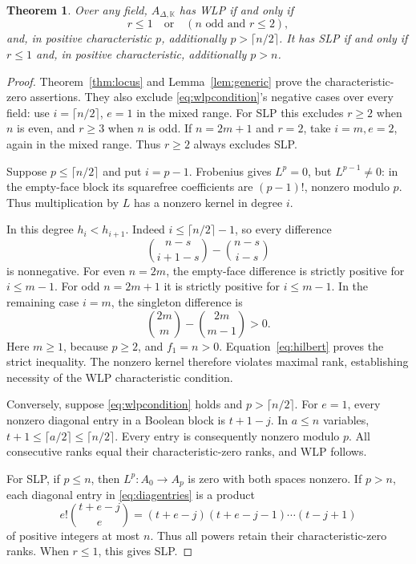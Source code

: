 \documentclass[11pt]{article}
\newtheorem{theorem}{Theorem}[section]
\theoremstyle{remark}
\newcommand{\kk}{\mathbb K}
\begin{document}
\begin{theorem}\label{thm:classification}
Over any field, $A_{\Delta,\kk}$ has WLP if and only if
\begin{equation}\label{eq:wlpcondition}
 r\leq1\quad\text{or}\quad(n\text{ odd and }r\leq2),
\end{equation}
and, in positive characteristic $p$, additionally $p>\lceil n/2\rceil$.
It has SLP if and only if $r\leq1$ and, in positive characteristic, additionally $p>n$.
\end{theorem}
\begin{proof}
Theorem~\ref{thm:locus} and Lemma~\ref{lem:generic} prove the characteristic-zero assertions. They also exclude \eqref{eq:wlpcondition}'s negative cases over every field: use $i=\lceil n/2\rceil$, $e=1$ in the mixed range. For SLP this excludes $r\geq2$ when $n$ is even, and $r\geq3$ when $n$ is odd. If $n=2m+1$ and $r=2$, take $i=m,e=2$, again in the mixed range. Thus $r\geq2$ always excludes SLP.

Suppose $p\leq\lceil n/2\rceil$ and put $i=p-1$. Frobenius gives $L^p=0$, but $L^{p-1}\ne0$: in the empty-face block its squarefree coefficients are $(p-1)!$, nonzero modulo $p$. Thus multiplication by $L$ has a nonzero kernel in degree $i$.

In this degree $h_i<h_{i+1}$. Indeed $i\leq\lceil n/2\rceil-1$, so every difference
\[
 \binom{n-s}{i+1-s}-\binom{n-s}{i-s}
\]
is nonnegative. For even $n=2m$, the empty-face difference is strictly positive for $i\leq m-1$. For odd $n=2m+1$ it is strictly positive for $i\leq m-1$. In the remaining case $i=m$, the singleton difference is
\[
 \binom{2m}{m}-\binom{2m}{m-1}>0.
\]
Here $m\geq1$, because $p\geq2$, and $f_1=n>0$. Equation~\eqref{eq:hilbert} proves the strict inequality. The nonzero kernel therefore violates maximal rank, establishing necessity of the WLP characteristic condition.

Conversely, suppose \eqref{eq:wlpcondition} holds and $p>\lceil n/2\rceil$. For $e=1$, every nonzero diagonal entry in a Boolean block is $t+1-j$. In $a\leq n$ variables, $t+1\leq\lceil a/2\rceil\leq\lceil n/2\rceil$. Every entry is consequently nonzero modulo $p$. All consecutive ranks equal their characteristic-zero ranks, and WLP follows.

For SLP, if $p\leq n$, then $L^p:A_0\to A_p$ is zero with both spaces nonzero. If $p>n$, each diagonal entry in \eqref{eq:diagentries} is a product
\[
 e!\binom{t+e-j}{e}
 =(t+e-j)(t+e-j-1)\cdots(t-j+1)
\]
of positive integers at most $n$. Thus all powers retain their characteristic-zero ranks. When $r\leq1$, this gives SLP.
\end{proof}
\end{document}
